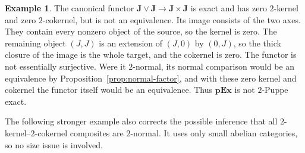 \documentclass[11pt,reqno,a4paper]{amsart}
\theoremstyle{definition}
\newtheorem{example}[theorem]{Example}
\theoremstyle{remark}
\newcommand{\0}{\mathbf{0}}
\renewcommand{\1}{\mathbf{1}}
\newcommand{\pExact}{\mathbf{pEx}}
\begin{document}
\begin{example}\label{ex:J-counterexample}
The canonical functor $\mathbf J\vee\mathbf J\to\mathbf J\times\mathbf J$
is exact and has zero $2$-kernel and zero $2$-cokernel, but is not an
equivalence. Its image consists of the two axes. They contain every
nonzero object of the source, so the kernel is zero. The remaining
object $(J,J)$ is an extension of $(J,0)$ by $(0,J)$, so the thick
closure of the image is the whole target, and the cokernel is zero.
The functor is not essentially surjective. Were it $2$-normal, its
normal comparison would be an equivalence by
Proposition~\ref{prop:normal-factor}, and with these zero kernel
and cokernel the functor itself would be an equivalence.
Thus $\pExact$ is not $2$-Puppe exact.
\end{example}

The following stronger example also corrects the possible inference
that all $2$-kernel--$2$-cokernel composites are $2$-normal. It uses only small
abelian categories, so no size issue is involved.
\end{document}
